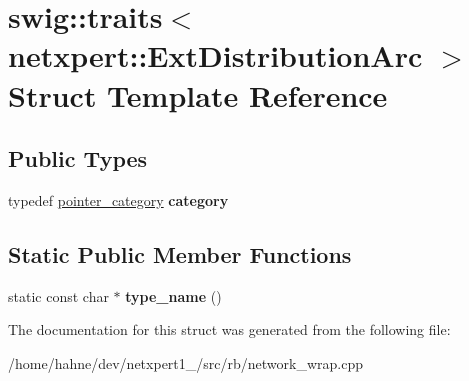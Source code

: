 \hypertarget{structswig_1_1traits_3_01netxpert_1_1ExtDistributionArc_01_4}{}\section{swig\+:\+:traits$<$ netxpert\+:\+:Ext\+Distribution\+Arc $>$ Struct Template Reference}
\label{structswig_1_1traits_3_01netxpert_1_1ExtDistributionArc_01_4}
\subsection*{Public Types}
\begin{DoxyCompactItemize}
\item 
typedef \hyperlink{structswig_1_1pointer__category}{pointer\+\_\+category} {\bfseries category}\hypertarget{structswig_1_1traits_3_01netxpert_1_1ExtDistributionArc_01_4_a9cc3cce04b5415c836b36e90886aa5d2}{}\label{structswig_1_1traits_3_01netxpert_1_1ExtDistributionArc_01_4_a9cc3cce04b5415c836b36e90886aa5d2}

\end{DoxyCompactItemize}
\subsection*{Static Public Member Functions}
\begin{DoxyCompactItemize}
\item 
static const char $\ast$ {\bfseries type\+\_\+name} ()\hypertarget{structswig_1_1traits_3_01netxpert_1_1ExtDistributionArc_01_4_a4758a9555232ae8828a8c97ff9c609bd}{}\label{structswig_1_1traits_3_01netxpert_1_1ExtDistributionArc_01_4_a4758a9555232ae8828a8c97ff9c609bd}

\end{DoxyCompactItemize}


The documentation for this struct was generated from the following file\+:\begin{DoxyCompactItemize}
\item 
/home/hahne/dev/netxpert1\+\_/src/rb/network\+\_\+wrap.\+cpp\end{DoxyCompactItemize}
